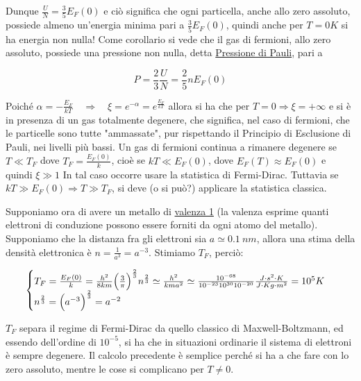 Dunque $\frac{ U}{N} = \frac{ 3}{5} E_F(0)$ e ciò significa che ogni particella, anche allo zero assoluto, 
possiede almeno un'energia minima pari a $\frac{ 3}{5} E_F(0)$, quindi anche per $T = 0 K $ si ha energia non nulla!
Come corollario si vede che il gas di fermioni, allo zero assoluto, possiede una pressione non nulla, detta
\underline{Pressione di Pauli}, pari a 

\begin{equation}
P = \frac{ 2}{3} \frac{ U}{N} = \frac{ 2}{5} n E_F(0)
\end{equation}

Poiché $\alpha = -\frac{ E_F}{k T} \quad \Rightarrow \quad \xi = e^{-\alpha} = e^{ \frac{ E_F}{k T}}$ allora si ha che per $T=0 \Rightarrow \xi = +\infty $
e si è in presenza di un gas totalmente degenere, che significa, nel caso di fermioni, che le particelle sono tutte "ammassate", pur rispettando il Principio di Esclusione di Pauli, nei livelli più bassi.
Un gas di fermioni continua a rimanere degenere se $T \ll T_F$ dove $T_F = \frac{ E_F(0)}{k}$, cioè se $kT \ll E_F(0)$, 
dove $E_F(T) \approx E_F(0)$ e quindi $\xi \gg 1$
In tal caso occorre usare la statistica di Fermi-Dirac.
Tuttavia se $kT \gg E_F(0) \Rightarrow T \gg T_F $, si deve (o si può?) applicare la statistica classica.

Supponiamo ora di avere un metallo di \underline{valenza 1} (la valenza esprime quanti elettroni di conduzione possono essere forniti da ogni atomo del metallo).
Supponiamo che la distanza fra gli elettroni sia $a \simeq \SI{0.1}{nm}$, allora una stima della densità elettronica è $n = \frac{ 1}{a^{ 3}} = a^{ -3}$.
Stimiamo $T_F$, perciò:

\begin{equation}
\begin{cases}
	T_F = \frac{ E_F(0)}{k} = \frac{ h^2}{8 k m} \Bigl(  \frac{ 3}{\pi}  \Bigr)^{ \frac{ 2}{3}} n^{ \frac{ 2}{3}} \simeq \frac{ h^2}{k m a^2} \simeq \frac{ 10^{ -68}}{10^{-23 } 10^{ 30} 10^{-20 }} \frac{ J \cdot s^2 \cdot K}{J \cdot Kg \cdot m^2} = 10^{5} K \\
	n^{ \frac{ 2}{3}} = \Bigl(  a^{ -3}  \Bigr)^{ \frac{ 2}{3}} = a^{ -2}
\end{cases}
\end{equation}

$T_F$ separa il regime di Fermi-Dirac da quello classico di Maxwell-Boltzmann, ed essendo dell'ordine di $10^{ -5}$, si ha che in situazioni ordinarie il sistema di elettroni è sempre degenere.
Il calcolo precedente è semplice perché si ha a che fare con lo zero assoluto, mentre le cose si complicano per $T \not = 0 $.

